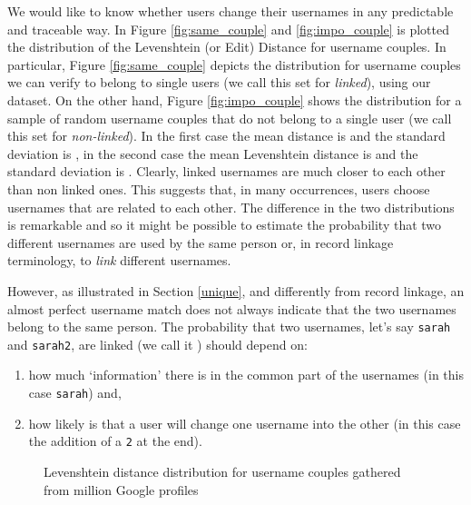 \documentclass[letterpaper]{sig-alternate}
\begin{document}
We would like to know whether users change their usernames in
any predictable and traceable way.
In Figure \ref{fig:same_couple} and \ref{fig:impo_couple} is plotted the distribution of the Levenshtein (or Edit) Distance for
username couples.  In particular, Figure \ref{fig:same_couple} depicts the
distribution for  username couples we can verify to belong to single users
(we call this set  for {\em linked}), using our dataset.  On the other hand,
Figure \ref{fig:impo_couple} shows the distribution for a sample of random
username couples that do not belong to a single user (we call this set  for
{\em non-linked}).  In the first case the mean distance is  and the
standard deviation is , in the second case the mean Levenshtein distance is  and the
standard deviation is . 
Clearly, linked usernames are much closer to each other than non linked ones.
This suggests that, in many occurrences, users choose usernames that are
related to each other.
The difference in the two distributions is remarkable and so it might be
possible to estimate the probability that two different usernames are used by
the same person or, in record linkage terminology, to {\em link} different
usernames. 

However, as illustrated in Section \ref{unique}, and differently from record linkage, an almost perfect username match does not always indicate that the
two usernames belong to the same person.
The probability that two usernames, let's say \texttt{sarah} and \texttt{sarah2}, are linked (we call it ) should depend
on:

\begin{enumerate} \item how much `information' there is in the common part of the usernames (in this
case \texttt{sarah}) and, 
\item how likely is that a user will change one username into
the other (in this case the addition of a \texttt{2} at the end). 
\end{enumerate}

\begin{figure}[ht]
\label{fig:leven}
\centering
{}
\caption[Caption]{Levenshtein distance distribution for username couples gathered from  million Google profiles}
\end{figure}
\end{document}
